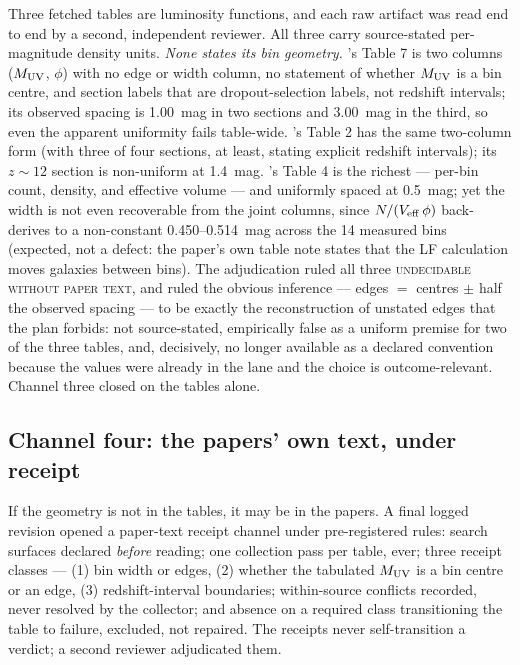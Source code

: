 \documentclass[twocolumn]{aastex702}
\begin{document}
Three fetched tables are luminosity functions, and each raw artifact was read end to end
by a second, independent reviewer. All three carry source-stated per-magnitude density
units. \emph{None states its bin geometry.} \citet{harikane23}'s Table 7 is two columns
($M_{\rm UV}$, $\phi$) with no edge or width column, no statement of whether $M_{\rm UV}$
is a bin centre, and section labels that are dropout-selection labels, not redshift
intervals; its observed spacing is 1.00~mag in two sections and 3.00~mag in the third,
so even the apparent uniformity fails table-wide. \citet{harikane24}'s Table 2 has the
same two-column form (with three of four sections, at least, stating explicit redshift
intervals); its $z\sim12$ section is non-uniform at 1.4~mag. \citet{finkelstein24}'s
Table 4 is the richest --- per-bin count, density, and effective volume --- and uniformly
spaced at 0.5~mag; yet the width is not even recoverable from the joint columns, since
$N/(V_{\rm eff}\,\phi)$ back-derives to a non-constant 0.450--0.514~mag across the 14
measured bins (expected, not a defect: the paper's own table note states that the LF
calculation moves galaxies between bins). The adjudication ruled all three
\textsc{undecidable without paper text}, and ruled the obvious inference --- edges $=$
centres $\pm$ half the observed spacing --- to be exactly the reconstruction of unstated
edges that the plan forbids: not source-stated, empirically false as a uniform premise
for two of the three tables, and, decisively, no longer available as a declared
convention because the values were already in the lane and the choice is
outcome-relevant. Channel three closed on the tables alone.

\subsection{Channel four: the papers' own text, under receipt} \label{sec:chan4}

If the geometry is not in the tables, it may be in the papers. A final logged revision
opened a paper-text receipt channel under pre-registered rules: search surfaces declared
\emph{before} reading; one collection pass per table, ever; three receipt classes ---
(1) bin width or edges, (2) whether the tabulated $M_{\rm UV}$ is a bin centre or an
edge, (3) redshift-interval boundaries; within-source conflicts recorded, never
resolved by the collector; and absence on a required class transitioning the table to
failure, excluded, not repaired. The receipts never self-transition a verdict; a second
reviewer adjudicated them.
\end{document}
